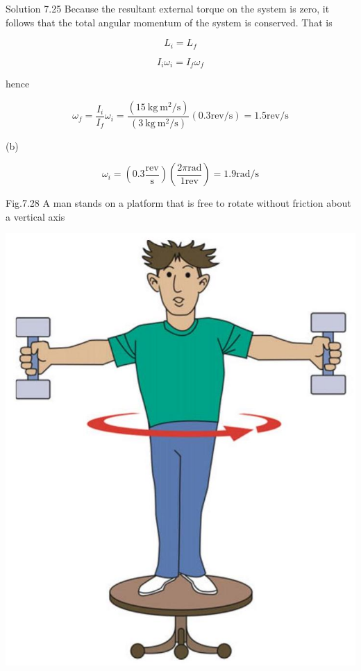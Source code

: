 \documentclass[10pt]{article}
\begin{document}
Solution 7.25 Because the resultant external torque on the system is zero, it follows that the total angular momentum of the system is conserved. That is

$$
L_{i}=L_{f}
$$

$$
I_{i} \omega_{i}=I_{f} \omega_{f}
$$

hence

$$
\omega_{f}=\frac{I_{i}}{I_{f}} \omega_{i}=\frac{\left(15 \mathrm{~kg} \mathrm{~m}^{2} / \mathrm{s}\right)}{\left(3 \mathrm{~kg} \mathrm{~m}^{2} / \mathrm{s}\right)}(0.3 \mathrm{rev} / \mathrm{s})=1.5 \mathrm{rev} / \mathrm{s}
$$

(b)

$$
\omega_{i}=\left(0.3 \frac{\mathrm{rev}}{\mathrm{s}}\right)\left(\frac{2 \pi \mathrm{rad}}{1 \mathrm{rev}}\right)=1.9 \mathrm{rad} / \mathrm{s}
$$

Fig.7.28 A man stands on a platform that is free to rotate without friction about a vertical axis

\begin{center}
\includegraphics[max width=\textwidth]{2024_09_13_db1f357d2aad0a03eb2eg-128(1)}
\end{center}
\end{document}
